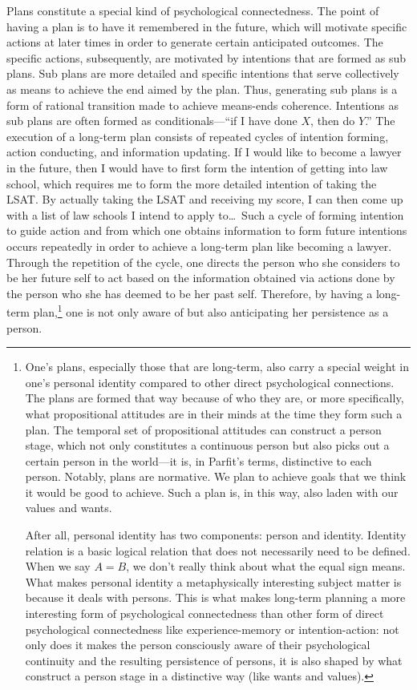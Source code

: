 Plans constitute a special kind of psychological connectedness. The
point of having a plan is to have it remembered in the future, which
will motivate specific actions at later times in order to generate
certain anticipated outcomes. The specific actions, subsequently, are
motivated by intentions that are formed as sub plans. Sub plans are more
detailed and specific intentions that serve collectively as means to
achieve the end aimed by the plan. Thus, generating sub plans is a form
of rational transition made to achieve means-ends coherence. Intentions
as sub plans are often formed as conditionals---``if I have done $X$,
then do $Y$.'' The execution of a long-term plan consists of repeated
cycles of intention forming, action conducting, and information
updating. If I would like to become a lawyer in the future, then I would
have to first form the intention of getting into law school, which
requires me to form the more detailed intention of taking the LSAT. By
actually taking the LSAT and receiving my score, I can then come up with
a list of law schools I intend to apply to\dots\ Such a cycle of
forming intention to guide action and from which one obtains information
to form future intentions occurs repeatedly in order to achieve a
long-term plan like becoming a lawyer. Through the repetition of the
cycle, one directs the person who she considers to be her future self to
act based on the information obtained via actions done by the person who
she has deemed to be her past self. Therefore, by having a long-term
plan,\footnote{One's plans, especially those that are long-term, also
  carry a special weight in one's personal identity compared to other
  direct psychological connections. The plans are formed that way
  because of who they are, or more specifically, what propositional
  attitudes are in their minds at the time they form such a plan. The
  temporal set of propositional attitudes can construct a person stage,
  which not only constitutes a continuous person but also picks out a
  certain person in the world---it is, in Parfit's terms, distinctive
  to each person. Notably, plans are normative. We plan to achieve goals
  that we think it would be good to achieve. Such a plan is, in this
  way, also laden with our values and wants.

  After all, personal identity has two components: person and identity.
  Identity relation is a basic logical relation that does not
  necessarily need to be defined. When we say $A=B$, we don't really think
  about what the equal sign means. What makes personal identity a
  metaphysically interesting subject matter is because it deals with
  persons. This is what makes long-term planning a more interesting form
  of psychological connectedness than other form of direct psychological
  connectedness like experience-memory or intention-action: not only
  does it makes the person consciously aware of their psychological
  continuity and the resulting persistence of persons, it is also shaped
  by what construct a person stage in a distinctive way (like wants and
  values).} one is not only aware of but also anticipating her
persistence as a person.

